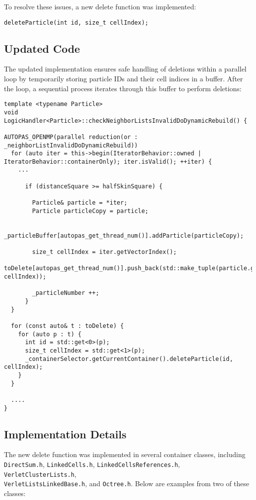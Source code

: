 To resolve these issues, a new delete function was implemented:
\begin{lstlisting}[style=cppstyle]
deleteParticle(int id, size_t cellIndex);
\end{lstlisting}

\subsection{Updated Code}
The updated implementation ensures safe handling of deletions within a parallel loop by temporarily storing particle IDs and their cell indices in a buffer. After the loop, a sequential process iterates through this buffer to perform deletions:

\begin{lstlisting}[style=cppstyle]
template <typename Particle>
void LogicHandler<Particle>::checkNeighborListsInvalidDoDynamicRebuild() {

AUTOPAS_OPENMP(parallel reduction(or : _neighborListInvalidDoDynamicRebuild))
  for (auto iter = this->begin(IteratorBehavior::owned | IteratorBehavior::containerOnly); iter.isValid(); ++iter) {
    ...

      if (distanceSquare >= halfSkinSquare) {

        Particle& particle = *iter;
        Particle particleCopy = particle;

       _particleBuffer[autopas_get_thread_num()].addParticle(particleCopy);

        size_t cellIndex = iter.getVectorIndex();
        toDelete[autopas_get_thread_num()].push_back(std::make_tuple(particle.getID(), cellIndex));

        _particleNumber ++;
      }
  }

  for (const auto& t : toDelete) {
    for (auto p : t) {
      int id = std::get<0>(p);
      size_t cellIndex = std::get<1>(p);
      _containerSelector.getCurrentContainer().deleteParticle(id, cellIndex);
    }
  }

  ....
}
\end{lstlisting}

\subsection{Implementation Details}
The new delete function was implemented in several container classes, including \texttt{DirectSum.h}, \texttt{LinkedCells.h}, \texttt{LinkedCellsReferences.h}, \texttt{VerletClusterLists.h}, \\ \texttt{VerletListsLinkedBase.h}, and \texttt{Octree.h}. Below are examples from two of these classes:


